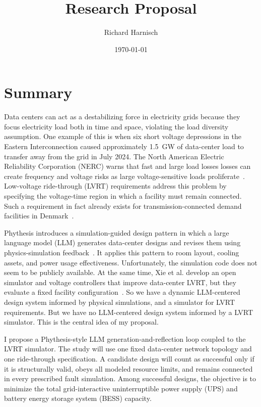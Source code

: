 \documentclass[11pt,a4paper]{article}
\title{\textbf{Research Proposal}}
\author{Richard Harnisch}
\date{\today}
\begin{document}
\maketitle
\vspace{-1em}

\section*{Summary}

Data centers can act as a destabilizing force in electricity grids because they focus electricity load both in time and space, violating the load diversity assumption. One example of this is when six short voltage depressions in the Eastern Interconnection caused approximately 1.5~GW of data-center load to transfer away from the grid in July 2024. The North American Electric Reliability Corporation (NERC) warns that fast and large load losses losses can create frequency and voltage risks as large voltage-sensitive loads proliferate~\cite{nerc2025incident}. Low-voltage ride-through (LVRT) requirements address this problem by specifying the voltage-time region in which a facility must remain connected. Such a requirement in fact already exists for transmission-connected demand facilities in Denmark~\cite{energinet2024tr343}.

Phythesis introduces a simulation-guided design pattern in which a large language model (LLM) generates data-center designs and revises them using physics-simulation feedback~\cite{li2026phythesis}. It applies this pattern to room layout, cooling assets, and power usage effectiveness. Unfortunately, the simulation code does not seem to be publicly available. At the same time, Xie et al. develop an open simulator and voltage controllers that improve data-center LVRT, but they evaluate a fixed facility configuration~\cite{xie2026lvrt}. So we have a dynamic LLM-centered design system informed by physical simulations, and a simulator for LVRT requirements. But we have no LLM-centered design system informed by a LVRT simulator. This is the central idea of my proposal.

I propose a Phythesis-style LLM generation-and-reflection loop coupled to the LVRT simulator. The study will use one fixed data-center network topology and one ride-through specification. A candidate design will count as successful only if it is structurally valid, obeys all modeled resource limits, and remains connected in every prescribed fault simulation. Among successful designs, the objective is to minimize the total grid-interactive uninterruptible power supply (UPS) and battery energy storage system (BESS) capacity.
\end{document}
